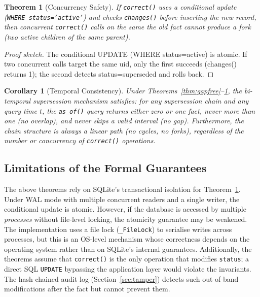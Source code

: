 \documentclass{article}
\newtheorem{theorem}{Theorem}
\newtheorem{corollary}{Corollary}
\begin{document}
\begin{theorem}[Concurrency Safety]
\label{theorem:concurrency}
If \texttt{correct()} uses a conditional update (\texttt{WHERE status='active'}) and checks \texttt{changes()} before inserting the new record, then concurrent \texttt{correct()} calls on the same the old fact cannot produce a fork (two active children of the same parent).
\end{theorem}

\begin{proof}[Proof sketch]
The conditional UPDATE (WHERE status=active) is atomic. If two concurrent calls target the same uid, only the first succeeds (changes() returns 1); the second detects status=superseded and rolls back.
\end{proof}

\begin{corollary}[Temporal Consistency]
\label{cor:consistency}
Under Theorems~\ref{thm:gapfree}--\ref{theorem:concurrency}, the bi-temporal supersession mechanism satisfies: for any supersession chain and any query time $t$, the \texttt{as\_of()} query returns either zero or one fact, never more than one (no overlap), and never skips a valid interval (no gap). Furthermore, the chain structure is always a linear path (no cycles, no forks), regardless of the number or concurrency of \texttt{correct()} operations.
\end{corollary}

\subsection{Limitations of the Formal Guarantees}

The above theorems rely on SQLite's transactional isolation for Theorem~\ref{theorem:concurrency}. Under WAL mode with multiple concurrent readers and a single writer, the conditional update is atomic. However, if the database is accessed by multiple \emph{processes} without file-level locking, the atomicity guarantee may be weakened. The implementation uses a file lock (\texttt{\_FileLock}) to serialise writes across processes, but this is an OS-level mechanism whose correctness depends on the operating system rather than on SQLite's internal guarantees. Additionally, the theorems assume that \texttt{correct()} is the only operation that modifies \texttt{status}; a direct SQL \texttt{UPDATE} bypassing the application layer would violate the invariants. The hash-chained audit log (Section~\ref{sec:tamper}) detects such out-of-band modifications after the fact but cannot prevent them.
\end{document}
